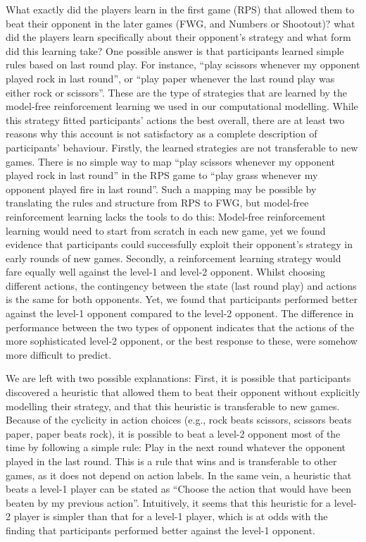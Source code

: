 \documentclass[man,floatsintext]{apa6}
\begin{document}
What exactly did the players learn in the first game (RPS) that allowed them to beat their opponent in the later games (FWG, and Numbers or Shootout)? what did the players learn specifically about their opponent's strategy and what form did this learning take?
One possible answer is that participants learned simple rules based on last round play. For instance, \enquote{play scissors whenever my opponent played rock in last round}, or \enquote{play paper whenever the last round play was either rock or scissors}. These are the type of strategies that are learned by the model-free reinforcement learning we used in our computational modelling. While this strategy fitted participants' actions the best overall, there are at least two reasons why this account is not satisfactory as a complete description of participants' behaviour. Firstly, the learned strategies are not transferable to new games. There is no simple way to map \enquote{play scissors whenever my opponent played rock in last round} in the RPS game to \enquote{play grass whenever my opponent played fire in last round}. Such a mapping may be possible by translating the rules and structure from RPS to FWG, but model-free reinforcement learning lacks the tools to do this: Model-free reinforcement learning would need to start from scratch in each new game, yet we found evidence that participants could successfully exploit their opponent's strategy in early rounds of new games. Secondly, a reinforcement learning strategy would fare equally well against the level-1 and level-2 opponent. Whilst choosing different actions, the contingency between the state (last round play) and actions is the same for both opponents. Yet, we found that participants performed better against the level-1 opponent compared to the level-2 opponent. The difference in performance between the two types of opponent indicates that the actions of the more sophisticated level-2 opponent, or the best response to these, were somehow more difficult to predict.

We are left with two possible explanations: First, it is possible that participants discovered a heuristic that allowed them to beat their opponent without explicitly modelling their strategy, and that this heuristic is transferable to new games. Because of the cyclicity in action choices (e.g., rock beats scissors, scissors beats paper, paper beats rock), it is possible to beat a level-2 opponent most of the time by following a simple rule: Play in the next round whatever the opponent played in the last round. This is a rule that wins and is transferable to other games, as it does not depend on action labels. In the same vein, a heuristic that beats a level-1 player can be stated as \enquote{Choose the action that would have been beaten by my previous action}. Intuitively, it seems that this heuristic for a level-2 player is simpler than that for a level-1 player, which is at odds with the finding that participants performed better against the level-1 opponent.
\end{document}
